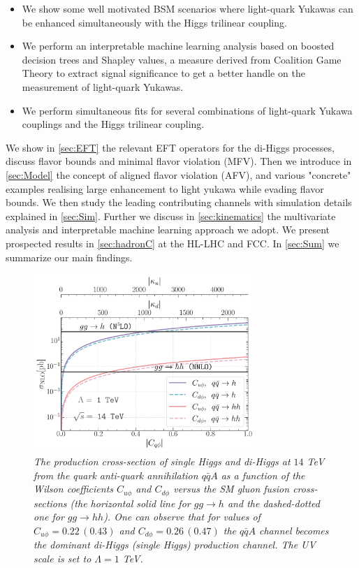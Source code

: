 \begin{itemize}
	\item We show some well motivated BSM scenarios where light-quark Yukawas can be enhanced simultaneously with the Higgs trilinear coupling.
	\item We perform an interpretable machine learning analysis based on boosted decision trees and Shapley values, a measure derived from Coalition Game Theory to extract signal significance to get a better handle on the measurement of light-quark Yukawas.
	\item We perform simultaneous fits for several combinations of light-quark Yukawa couplings and the Higgs trilinear coupling.
\end{itemize}

We show in \autoref{sec:EFT} the relevant EFT operators for the di-Higgs processes, discuss flavor bounds and minimal flavor violation (MFV). Then we introduce in \autoref{sec:Model} the concept of aligned flavor violation (AFV), and various "concrete" examples realising large enhancement to light yukawa while evading flavor bounds. We then study the leading contributing channels with simulation details explained in \autoref{sec:Sim}. Further we discuss in \autoref{sec:kinematics} the multivariate analysis and interpretable machine learning approach we adopt. We present prospected results in \autoref{sec:hadronC} at the HL-LHC and FCC. In \autoref{sec:Sum} we summarize our main findings.

\begin{figure}[t]
	\centering
	\includegraphics[width=0.75\textwidth]{fig/pph_hh_14Tev.pdf}
	\caption{\it The production cross-section of single Higgs and di-Higgs at $14$ TeV from the quark anti-quark annihilation $q\bar{q}A$ as a function of the Wilson coefficients $C_{u\phi}$ and $C_{d\phi}$ versus the SM gluon fusion cross-sections (the horizontal solid line for $gg \to h$ and the dashed-dotted one for $gg \to hh$). One can observe that for values of $C_{u\phi}=0.22\, (0.43)$ and $C_{d\phi}=0.26\, (0.47)$ the $q\bar{q}A$ channel becomes the dominant di-Higgs (single Higgs) production channel. The UV scale is set to $\Lambda = 1$ TeV. }
	\label{fig:pphhvsh}
\end{figure} 

